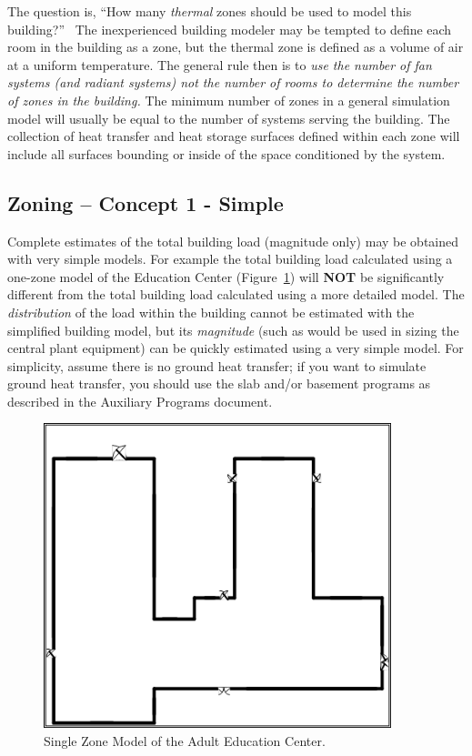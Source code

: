 The question is, ``How many \emph{thermal} zones should be used to model this building?''~ The inexperienced building modeler may be tempted to define each room in the building as a zone, but the thermal zone is defined as a volume of air at a uniform temperature. The general rule then is to \emph{use the number of fan systems (and radiant systems) not the number of rooms to determine the number of zones in the building.} The minimum number of zones in a general simulation model will usually be equal to the number of systems serving the building. The collection of heat transfer and heat storage surfaces defined within each zone will include all surfaces bounding or inside of the space conditioned by the system.

\subsection{Zoning -- Concept 1 - Simple}\label{zoning-concept-1---simple}

Complete estimates of the total building load (magnitude only) may be obtained with very simple models. For example the total building load calculated using a one-zone model of the Education Center (Figure~\ref{fig:single-zone-model-of-the-adult-education}) will \textbf{NOT} be significantly different from the total building load calculated using a more detailed model. The \emph{distribution} of the load within the building cannot be estimated with the simplified building model, but its \emph{magnitude} (such as would be used in sizing the central plant equipment) can be quickly estimated using a very simple model. For simplicity, assume there is no ground heat transfer; if you want to simulate ground heat transfer, you should use the slab and/or basement programs as described in the Auxiliary Programs document.

\begin{figure}[hbtp] %
\centering
\includegraphics[width=0.9\textwidth, height=0.9\textheight, keepaspectratio=true]{media/image013.png}
\caption{Single Zone Model of the Adult Education Center. \protect \label{fig:single-zone-model-of-the-adult-education}}
\end{figure}


